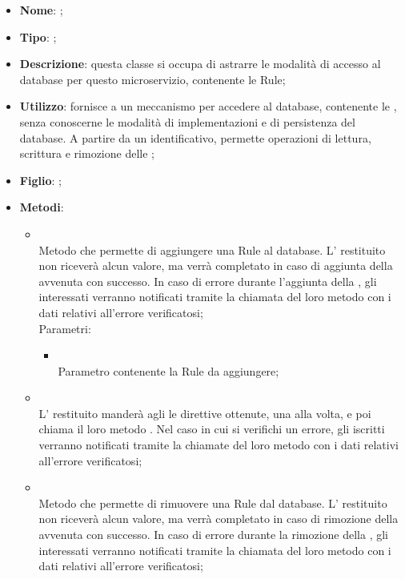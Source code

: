 \begin{itemize}
	\item \textbf{Nome}: ;
	\item \textbf{Tipo}: ;
	\item \textbf{Descrizione}: questa classe si occupa di astrarre le modalità di accesso al database per questo microservizio, contenente le Rule;
	\item \textbf{Utilizzo}: fornisce a  un meccanismo per accedere al database, contenente le , senza conoscerne le modalità di implementazioni e di persistenza del database. A partire da un identificativo, permette operazioni di lettura, scrittura e rimozione delle ;
	\item \textbf{Figlio}: ;
	\item \textbf{Metodi}:
	\begin{itemize}
		\item[]  \\
		Metodo che permette di aggiungere una Rule al database.  L' restituito non riceverà alcun valore, ma verrà completato in caso di aggiunta della  avvenuta con successo. In caso di errore durante l'aggiunta della , gli  interessati verranno notificati tramite la chiamata del loro metodo  con i dati relativi all'errore verificatosi;\\
		Parametri:
		\begin{itemize}
			\item {} \\
			Parametro contenente la Rule da aggiungere;
		\end{itemize}
		\item[]  \\
		L' restituito manderà agli  le direttive ottenute, una alla volta, e poi chiama il loro metodo . Nel caso in cui si verifichi un errore, gli  iscritti verranno notificati tramite la chiamate del loro metodo  con i dati relativi all'errore verificatosi;\\
		\item[]  \\
		Metodo che permette di rimuovere una Rule dal database. L' restituito non riceverà alcun valore, ma verrà completato in caso di rimozione della  avvenuta con successo. In caso di errore durante la rimozione della , gli  interessati verranno notificati tramite la chiamata del loro metodo  con i dati relativi all'errore verificatosi;\\

\end{itemize}
\end{itemize}
